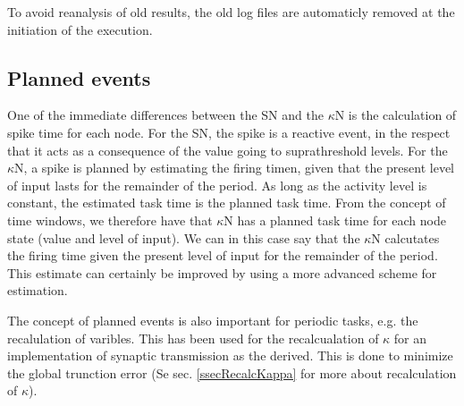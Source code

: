 To avoid reanalysis of old results, the old log files are automaticly removed at the initiation of the execution.








\subsection{Planned events}
	\label{secPlannedEvents}
	One of the immediate differences between the SN and the $\kappa$N is the calculation of spike time for each node.
	For the SN, the spike is a reactive event, in the respect that it acts as a consequence of the value going to suprathreshold levels.
	For the $\kappa$N, a spike is planned by estimating the firing timen, given that the present level of input lasts for the remainder of the period. %
	As long as the activity level is constant, the estimated task time is the planned task time.
	From the concept of time windows, we therefore have that $\kappa$N has a planned task time for each node state (value and level of input).
	We can in this case say that the $\kappa$N calcutates the firing time given the present level of input for the remainder of the period.
	This estimate can certainly be improved by using a more advanced scheme for estimation.

	The concept of planned events is also important for periodic tasks, e.g. the recalulation of varibles. 
	This has been used for the recalcualation of $\kappa$ for an implementation of synaptic transmission as the derived.
	This is done to minimize the global trunction error (Se sec. \ref{ssecRecalcKappa} for more about recalculation of $\kappa$).

